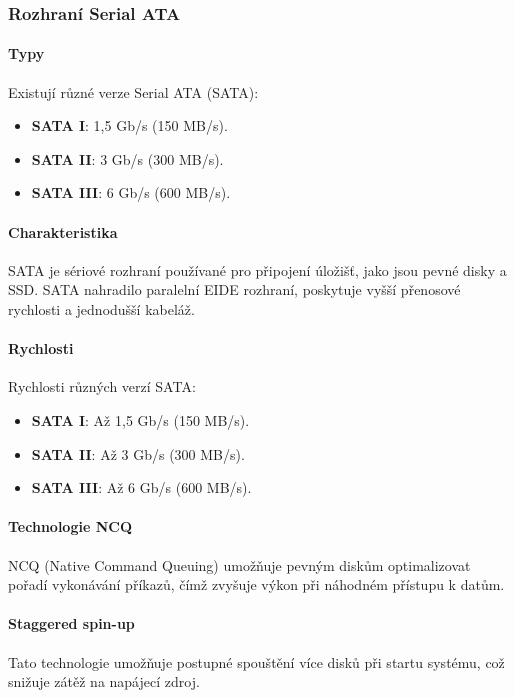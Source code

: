 \subsubsection{Rozhraní Serial ATA}

\paragraph{Typy}
Existují různé verze Serial ATA (SATA):
\begin{itemize}
\item \textbf{SATA I}: 1,5 Gb/s (150 MB/s).
\item \textbf{SATA II}: 3 Gb/s (300 MB/s).
\item \textbf{SATA III}: 6 Gb/s (600 MB/s).
\end{itemize}

\paragraph{Charakteristika}
SATA je sériové rozhraní používané pro připojení úložišť, jako jsou pevné disky a SSD. SATA nahradilo paralelní EIDE rozhraní, poskytuje vyšší přenosové rychlosti a jednodušší kabeláž.

\paragraph{Rychlosti}
Rychlosti různých verzí SATA:
\begin{itemize}
\item \textbf{SATA I}: Až 1,5 Gb/s (150 MB/s).
\item \textbf{SATA II}: Až 3 Gb/s (300 MB/s).
\item \textbf{SATA III}: Až 6 Gb/s (600 MB/s).
\end{itemize}

\paragraph{Technologie NCQ}
NCQ (Native Command Queuing) umožňuje pevným diskům optimalizovat pořadí vykonávání příkazů, čímž zvyšuje výkon při náhodném přístupu k datům.

\paragraph{Staggered spin-up}
Tato technologie umožňuje postupné spouštění více disků při startu systému, což snižuje zátěž na napájecí zdroj.

